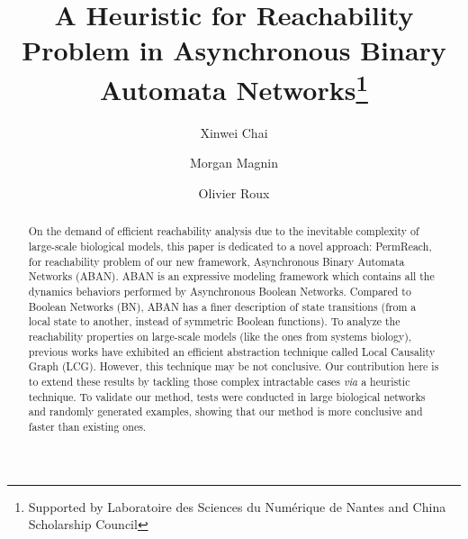 \documentclass[runningheads]{llncs}
\begin{document}
%
\title{A Heuristic for Reachability Problem in Asynchronous Binary Automata Networks\thanks{Supported by Laboratoire des Sciences du Num\'erique de Nantes and China Scholarship Council}}
%
%
\author{Xinwei Chai \and Morgan Magnin \and Olivier Roux}
%
%
%
\maketitle              %
%
\begin{abstract}
On the demand of efficient reachability analysis due to the inevitable complexity of large-scale biological models, this paper is dedicated to a novel approach: PermReach, for reachability problem of our new framework, Asynchronous Binary Automata Networks (ABAN). 
ABAN is an expressive modeling framework which contains all the dynamics behaviors performed by Asynchronous Boolean Networks. 
Compared to Boolean Networks (BN), ABAN has a finer description of state transitions (from a local state to another, instead of symmetric Boolean functions). 
To analyze the reachability properties on large-scale models (like the ones from systems biology), previous works have exhibited an efficient abstraction technique called Local Causality Graph (LCG).
However, this technique may be not conclusive. Our contribution here is to extend these results by tackling those complex intractable cases \textit{via} a heuristic technique. 
To validate our method, tests were conducted in large biological networks and randomly generated examples, showing that our method is more conclusive and faster than existing ones.

\end{abstract}
\end{document}
